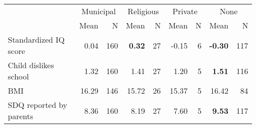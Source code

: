 \begin{tabular}{l r r r r r r r r}
\toprule
& \multicolumn{2}{c}{Municipal} & \multicolumn{2}{c}{Religious} & \multicolumn{2}{c}{Private} & \multicolumn{2}{c}{None} \\
& \scriptsize Mean & \scriptsize N & \scriptsize Mean & \scriptsize N & \scriptsize Mean & \scriptsize N & \scriptsize Mean & \scriptsize N \\
\midrule
Standardized IQ score &      0.04 &       160 & \textbf{     0.32} &        27 &     -0.15 &         6 & \textbf{    -0.30} &       117 \\
Child dislikes school &      1.32 &       160 &      1.41 &        27 &      1.20 &         5 & \textbf{     1.51} &       116 \\
BMI &     16.29 &       146 &     15.72 &        26 &     15.37 &         5 &     16.42 &        84 \\
SDQ reported by parents &      8.36 &       160 &      8.19 &        27 &      7.60 &         5 & \textbf{     9.53} &       117 \\
\bottomrule
\end{tabular}

